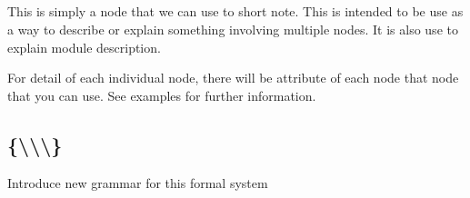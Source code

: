 \documentclass[11pt, a4paper]{article}
\begin{document}

\subsection{\kComment {}}
\newcommand{\nCommentNoHead}[1]{
    \node{\kComment}{#1 & \\}
}
This is simply a node that we can use to short note. This is intended to be use as a way to describe or explain something involving multiple nodes. It is also use to explain module description.

For detail of each individual node, there will be \kComment attribute of each node that node that you can use. See examples for further information.

\newcommand{\kVarRegex}{\pkw{var\_regex}}
\newcommand{\kExtend}{\pkw{extend}}
\newcommand{\kChoice}{\pkw{choice}}
\newcommand{\kRef}{\pkw{ref}}
\newcommand{\kRegex}{\pkw{regex}}
\newcommand{\kSubGrammar}{\pkw{sub\_grammar}}
\newcommand{\kKeyGrammar}{\pkw{key\_grammar}}
\newcommand{\kValueGrammar}{\pkw{value\_grammar}}
\newcommand{\kSeparator}{\pkw{separator}}
\newcommand{\kDelimiter}{\pkw{delimiter}}
\newcommand{\kWhenEmpty}{\pkw{when\_empty}}
\newcommand{\kCommutative}{\pkw{commutative}}
\newcommand{\kIdempotent}{\pkw{idempotent}}

\subsection{\kGrammar {} \{\kInductive \textbackslash \kLiteral \textbackslash \kSequence \textbackslash \kDictionary\} }
Introduce new grammar for this formal system
\end{document}
